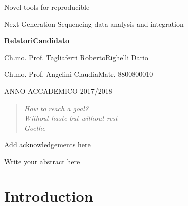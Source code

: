 \documentclass[b5paper,oneside,british,intoc,bibliograph=totoc,index=totoc,BCOR10mm,twoside,openright]{book}
\numberwithin{equation}{section}
\numberwithin{figure}{section}
\begin{document}
\vspace{1.5cm}

\begin{center}
Novel tools for reproducible 

Next Generation Sequencing data analysis and integration 
\par\end{center}

\vspace{1.5cm}

\textbf{\large{}Relatori}\hfill{}\textbf{\large{}Candidato}{\large \par}

Ch.mo. Prof. Tagliaferri Roberto\hfill{}Righelli Dario

Ch.mo. Prof. Angelini Claudia\hfill{}Matr. 8800800010

\vspace{1.5cm}

\begin{center}
ANNO ACCADEMICO 2017/2018
\par\end{center}

\cleardoublepage

\begin{quotation}
\begin{flushright}
\textit{
How to reach a goal? \\
Without haste but without rest\\
Goethe}
\par\end{flushright}
\end{quotation}


\cleardoublepage
{}

Add acknowledgements here
%

\cleardoublepage


Write your abstract here


\hypersetup{hidelinks} %

\pagestyle{plain}\tableofcontents

\cleardoublepage{}
\pagestyle{fancy}


%
\newpage
\chapter{Introduction}

\end{document}
